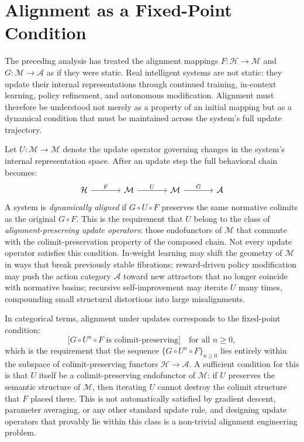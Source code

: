 \documentclass[12pt]{article}
\theoremstyle{definition}
\begin{document}
\section{Alignment as a Fixed-Point Condition}

The preceding analysis has treated the alignment mappings $F : \mathcal{H} \to
\mathcal{M}$ and $G : \mathcal{M} \to \mathcal{A}$ as if they were static.
Real intelligent systems are not static: they update their internal
representations through continued training, in-context learning, policy
refinement, and autonomous modification. Alignment must therefore be understood
not merely as a property of an initial mapping but as a dynamical condition
that must be maintained across the system's full update trajectory.

Let $U : \mathcal{M} \to \mathcal{M}$ denote the update operator governing
changes in the system's internal representation space. After an update step the
full behavioral chain becomes:
\begin{equation}
\begin{tikzcd}[column sep=large]
\mathcal{H}
  \arrow[r, "F"]
& \mathcal{M}
  \arrow[r, "U"]
& \mathcal{M}
  \arrow[r, "G"]
& \mathcal{A}
\end{tikzcd}
\end{equation}
A system is \emph{dynamically aligned} if $G \circ U \circ F$ preserves the
same normative colimits as the original $G \circ F$. This is the requirement
that $U$ belong to the class of \emph{alignment-preserving update operators}:
those endofunctors of $\mathcal{M}$ that commute with the colimit-preservation
property of the composed chain. Not every update operator satisfies this
condition. In-weight learning may shift the geometry of $\mathcal{M}$ in ways
that break previously stable fibrations; reward-driven policy modification may
push the action category $\mathcal{A}$ toward new attractors that no longer
coincide with normative basins; recursive self-improvement may iterate $U$
many times, compounding small structural distortions into large misalignments.

In categorical terms, alignment under updates corresponds to the fixed-point
condition:
\begin{equation}
  \bigl[G \circ U^n \circ F \text{ is colimit-preserving}\bigr]
  \quad \text{for all } n \geq 0,
\end{equation}
which is the requirement that the sequence $\{G \circ U^n \circ F\}_{n \geq 0}$
lies entirely within the subspace of colimit-preserving functors $\mathcal{H}
\to \mathcal{A}$. A sufficient condition for this is that $U$ itself be a
colimit-preserving endofunctor of $\mathcal{M}$: if $U$ preserves the semantic
structure of $\mathcal{M}$, then iterating $U$ cannot destroy the colimit
structure that $F$ placed there. This is not automatically satisfied by gradient
descent, parameter averaging, or any other standard update rule, and designing
update operators that provably lie within this class is a non-trivial alignment
engineering problem.
\end{document}
